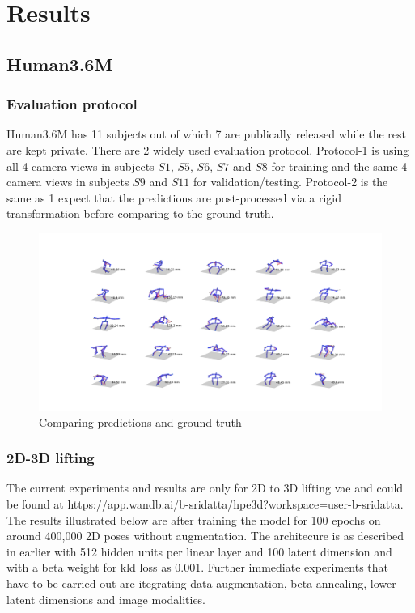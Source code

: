 \chapter{Results} %

\section{Human3.6M}
\subsection{Evaluation protocol}
Human3.6M has 11 subjects out of which 7 are publically released while the rest are kept private. There are 2 widely used evaluation protocol. Protocol-1 is using all 4 camera views in subjects $S1$, $S5$, $S6$, $S7$ and $S8$ for training and the 
same 4 camera views in subjects $S9$ and $S11$ for validation/testing. Protocol-2 is the same as 1 expect that the predictions are post-processed via a rigid transformation
before comparing to the ground-truth.

\begin{figure}[h]
    \centering
    \includegraphics[width=\textwidth]{figures/results25_66mm.png}
    \caption{Comparing predictions and ground truth}
    \label{fig:results25}
\end{figure}

\subsection{2D-3D lifting}
The current experiments and results are only for 2D to 3D lifting \ac{vae} and could be found at https://app.wandb.ai/b-sridatta/hpe3d?workspace=user-b-sridatta. The results illustrated below are after training the model for 100 epochs on around 400,000 2D poses without augmentation. The architecure is as described in earlier with 512 hidden units per linear layer and 100 latent dimension and with a beta weight for \ac{kld} loss as 0.001. Further immediate experiments that have to be carried out are itegrating data augmentation, beta annealing, lower latent dimensions and image modalities. 

